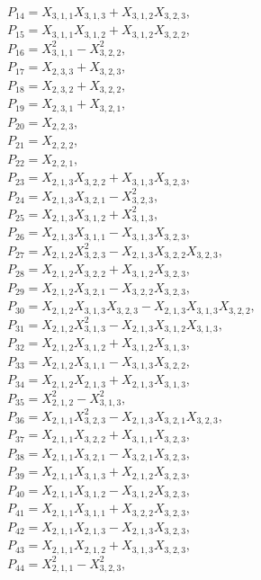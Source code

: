 \documentclass[10pt]{beamer}
\begin{document}
$P_{14}=X_{3,1,1}X_{3,1,3}+X_{3,1,2}X_{3,2,3},$\\
$P_{15}=X_{3,1,1}X_{3,1,2}+X_{3,1,2}X_{3,2,2},$\\
$P_{16}=X_{3,1,1}^2-X_{3,2,2}^2,$\\
$P_{17}=X_{2,3,3}+X_{3,2,3},$\\
$P_{18}=X_{2,3,2}+X_{3,2,2},$\\
$P_{19}=X_{2,3,1}+X_{3,2,1},$\\
$P_{20}=X_{2,2,3},$\\
$P_{21}=X_{2,2,2},$\\
$P_{22}=X_{2,2,1},$\\
$P_{23}=X_{2,1,3}X_{3,2,2}+X_{3,1,3}X_{3,2,3},$\\
$P_{24}=X_{2,1,3}X_{3,2,1}-X_{3,2,3}^2,$\\
$P_{25}=X_{2,1,3}X_{3,1,2}+X_{3,1,3}^2,$\\
$P_{26}=X_{2,1,3}X_{3,1,1}-X_{3,1,3}X_{3,2,3},$\\
$P_{27}=X_{2,1,2}X_{3,2,3}^2-X_{2,1,3}X_{3,2,2}X_{3,2,3},$\\
$P_{28}=X_{2,1,2}X_{3,2,2}+X_{3,1,2}X_{3,2,3},$\\
$P_{29}=X_{2,1,2}X_{3,2,1}-X_{3,2,2}X_{3,2,3},$\\
$P_{30}=X_{2,1,2}X_{3,1,3}X_{3,2,3}-X_{2,1,3}X_{3,1,3}X_{3,2,2},$\\
$P_{31}=X_{2,1,2}X_{3,1,3}^2-X_{2,1,3}X_{3,1,2}X_{3,1,3},$\\
$P_{32}=X_{2,1,2}X_{3,1,2}+X_{3,1,2}X_{3,1,3},$\\
$P_{33}=X_{2,1,2}X_{3,1,1}-X_{3,1,3}X_{3,2,2},$\\
$P_{34}=X_{2,1,2}X_{2,1,3}+X_{2,1,3}X_{3,1,3},$\\
$P_{35}=X_{2,1,2}^2-X_{3,1,3}^2,$\\
$P_{36}=X_{2,1,1}X_{3,2,3}^2-X_{2,1,3}X_{3,2,1}X_{3,2,3},$\\
$P_{37}=X_{2,1,1}X_{3,2,2}+X_{3,1,1}X_{3,2,3},$\\
$P_{38}=X_{2,1,1}X_{3,2,1}-X_{3,2,1}X_{3,2,3},$\\
$P_{39}=X_{2,1,1}X_{3,1,3}+X_{2,1,2}X_{3,2,3},$\\
$P_{40}=X_{2,1,1}X_{3,1,2}-X_{3,1,2}X_{3,2,3},$\\
$P_{41}=X_{2,1,1}X_{3,1,1}+X_{3,2,2}X_{3,2,3},$\\
$P_{42}=X_{2,1,1}X_{2,1,3}-X_{2,1,3}X_{3,2,3},$\\
$P_{43}=X_{2,1,1}X_{2,1,2}+X_{3,1,3}X_{3,2,3},$\\
$P_{44}=X_{2,1,1}^2-X_{3,2,3}^2,$\\
\end{document}
